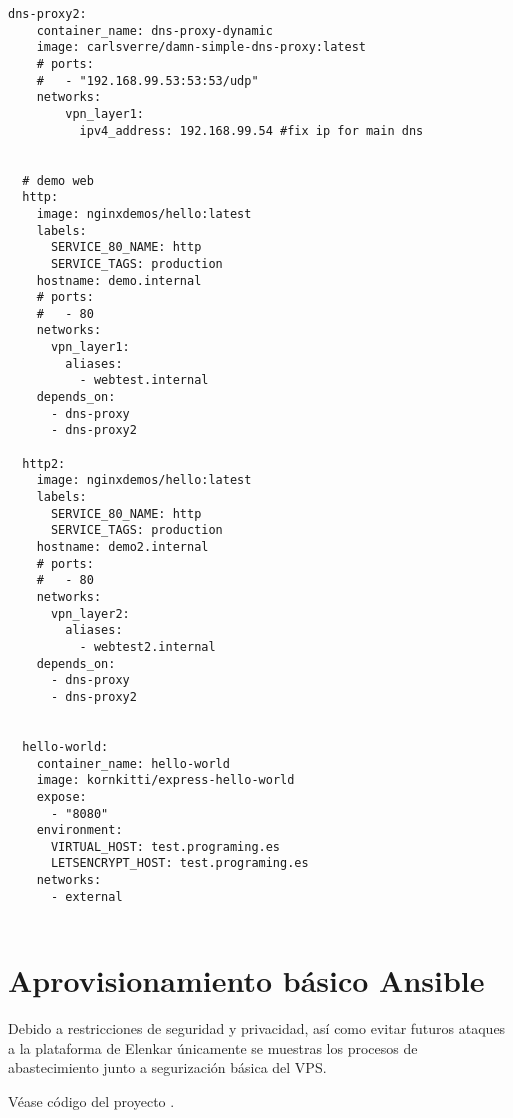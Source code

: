 \begin{lstlisting}[style=yaml, caption={docker-compose.yml MVP prueba de concepto.}, label={lst:mvp_mock} ]
  dns-proxy2:
    container_name: dns-proxy-dynamic
    image: carlsverre/damn-simple-dns-proxy:latest
    # ports:
    #   - "192.168.99.53:53:53/udp"
    networks:
        vpn_layer1:
          ipv4_address: 192.168.99.54 #fix ip for main dns
  

  # demo web
  http:
    image: nginxdemos/hello:latest
    labels:
      SERVICE_80_NAME: http
      SERVICE_TAGS: production
    hostname: demo.internal
    # ports:
    #   - 80
    networks:
      vpn_layer1:
        aliases:
          - webtest.internal
    depends_on:
      - dns-proxy
      - dns-proxy2

  http2:
    image: nginxdemos/hello:latest
    labels:
      SERVICE_80_NAME: http
      SERVICE_TAGS: production
    hostname: demo2.internal
    # ports:
    #   - 80
    networks:
      vpn_layer2:
        aliases:
          - webtest2.internal
    depends_on:
      - dns-proxy
      - dns-proxy2


  hello-world:
    container_name: hello-world
    image: kornkitti/express-hello-world
    expose:
      - "8080"
    environment:
      VIRTUAL_HOST: test.programing.es
      LETSENCRYPT_HOST: test.programing.es
    networks:
      - external


\end{lstlisting}

\section{Aprovisionamiento básico Ansible}\label{S:ansible_ejemplo}
Debido a restricciones de seguridad y privacidad, así como evitar futuros ataques a la plataforma de Elenkar únicamente se muestras los procesos de abastecimiento junto a segurización básica del VPS.

Véase código del proyecto \cite{c_code}.
